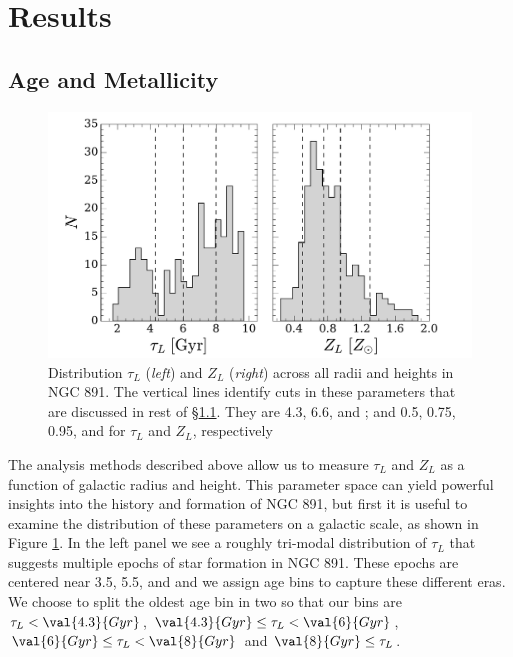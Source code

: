 \section{Results}
\label{891_2:sec:results}

\subsection{Age and Metallicity}
\label{891_2:sec:tZ}

\begin{figure}
  \centering
  \includegraphics[width=\textwidth]{891_2/figs/tauZ_hist.pdf}
  \caption[Global distribution of $\tau_L$ and
    $Z_L$]{\fixspacing\label{891_2:fig:tauZ_hist}Distribution $\tau_L$
    (\emph{left}) and $Z_L$ (\emph{right}) across all radii and
    heights in NGC 891. The vertical lines identify cuts in these
    parameters that are discussed in rest of
    \S\ref{891_2:sec:tZ}. They are 4.3, 6.6, and ; and
    0.5, 0.75, 0.95, and  for $\tau_L$ and $Z_L$,
    respectively}
\end{figure}

The analysis methods described above allow us to measure $\tau_L$ and
$Z_L$ as a function of galactic radius and height. This parameter
space can yield powerful insights into the history and formation of
NGC 891, but first it is useful to examine the distribution of these
parameters on a galactic scale, as shown in Figure
\ref{891_2:fig:tauZ_hist}. In the left panel we see a roughly
tri-modal distribution of $\tau_L$ that suggests multiple epochs of
star formation in NGC 891. These epochs are centered near 3.5, 5.5,
and  and we assign age bins to capture these different
eras. We choose to split the oldest age bin in two so that our bins
are $\tau_L < \val{4.3}{Gyr}$, $\val{4.3}{Gyr}\leq\tau_L <
\val{6}{Gyr}$, $\val{6}{Gyr}\leq\tau_L < \val{8}{Gyr}$ and
$\val{8}{Gyr}\leq\tau_L$.

